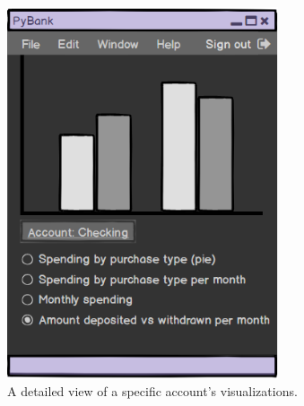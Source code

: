\FloatBarrier
\begin{figure}[!ht]
    \centering
    \includegraphics[width=8cm]{figures/accountgraphs.png}
    \caption{A detailed view of a specific account's visualizations.}
    \label{fig:graphs}
\end{figure}

\FloatBarrier
